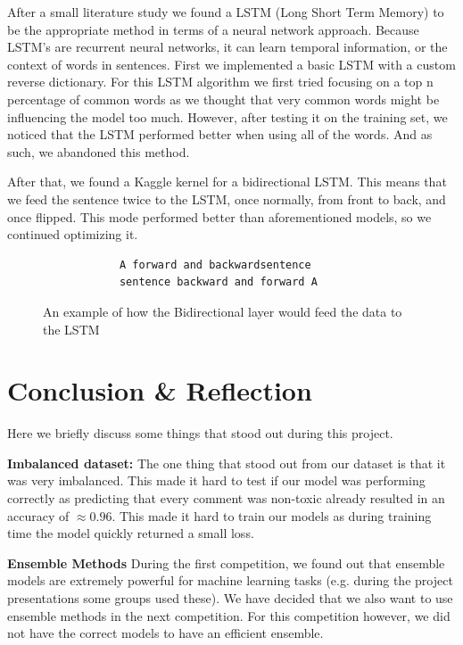 \documentclass[10pt, a4paper]{article}
\begin{document}
\begin{multicols}{2}
		After a small literature study we found a LSTM (Long Short Term Memory) to be the appropriate method in terms of a neural network approach. Because LSTM's are recurrent neural networks, it can learn temporal information, or the context of words in sentences. First we implemented a basic LSTM with a custom reverse dictionary. For this LSTM algorithm we first tried focusing on a top n percentage of common words as we thought that very common words might be influencing the model too much. However, after testing it on the training set, we noticed that the LSTM performed better when using all of the words. And as such, we abandoned this method.
		
		After that, we found a Kaggle kernel for a bidirectional LSTM. This means that we feed the sentence twice to the LSTM, once normally, from front to back, and once flipped. This mode performed better than aforementioned models, so we continued optimizing it.
		
		\begin{figure}
			\begin{verbatim}	
			A forward and backwardsentence
			sentence backward and forward A
			\end{verbatim}
			\caption{An example of how the  Bidirectional layer would feed the data to the LSTM}
		\end{figure}
		
		
		
		\section{Conclusion & Reflection}
		Here we briefly discuss some things that stood out during this project.
		
		\textbf{Imbalanced dataset:} The one thing that stood out from our dataset is that it was very imbalanced. This made it hard to test if our model was performing correctly as predicting that every comment was non-toxic already resulted in an accuracy of $\approx 0.96$. This made it hard to train our models as during training time the model quickly returned a small loss.
		
		\textbf{Ensemble Methods} During the first competition, we found out that ensemble models are extremely powerful for machine learning tasks (e.g. during the project presentations some groups used these). We have decided that we also want to use ensemble methods in the next competition. For this competition however, we did not have the correct models to have an efficient ensemble.
		

\end{multicols}
\end{document}

